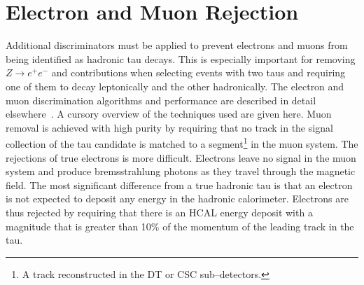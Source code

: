 \section{Electron and Muon Rejection}
\label{sec:LightLeptonRejection} Additional discriminators must be applied to
prevent electrons and muons from being identified as hadronic tau decays.  This
is especially important for removing $Z\to e^+e^-$ and \ZMM contributions when
selecting events with two taus and requiring one of them to decay leptonically
and the other hadronically.  The electron and muon discrimination algorithms and
performance are described in detail elsewhere~\cite{CMS-PAS-PFT-08-001}.  A cursory
overview of the techniques used are given here.  Muon removal is achieved with
high purity by requiring that no track in the signal collection of the tau
candidate is matched to a segment\footnote{A track reconstructed in the DT or
CSC sub--detectors.} in the muon system.  The rejections of true electrons is
more difficult.  Electrons leave no signal in the muon system and produce
bremsstrahlung photons as they travel through the magnetic field.  The most
significant difference from a true hadronic tau is that an electron is not
expected to deposit any energy in the hadronic calorimeter.  Electrons are thus
rejected by requiring that there is an HCAL energy deposit with a magnitude that
is greater than 10\% of the momentum of the leading track in the tau.

\ifx\master\undefined\fi
